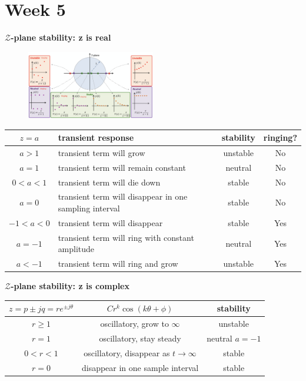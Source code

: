 \section{Week 5}
\textbf{$\mathcal{Z}$-plane stability: z is real}
\begin{figure}[H]
    \centering
    \includegraphics[width=0.5\textwidth]{images/z_plane_stability.png}
\end{figure}

\begin{table}[h]
\begin{adjustbox}{max width=\textwidth}
\begin{tabular}{|c|p{}|c|c|}
\hline
\textbf{$z=a$} & \textbf{transient response} & \textbf{stability} & \textbf{ringing?} \\\hline
$a> 1$ & transient term will grow & unstable & No \\\hline
$a = 1$ & transient term will remain constant & neutral & No \\\hline
$0<a<1$ & transient term will die down & stable & No \\\hline
$a=0$ & transient term will disappear in one sampling interval & stable & No \\\hline
$-1<a<0$ & transient term will disappear & stable & Yes \\\hline
$a = -1$ & transient term will ring with constant amplitude & neutral & Yes \\\hline
$a < -1$ & transient term will ring and grow & unstable & Yes \\\hline
\end{tabular}
\end{adjustbox}
\end{table}
\clearpage

\textbf{$\mathcal{Z}$-plane stability: z is complex}
\begin{table}[h]
\begin{adjustbox}{max width=\textwidth}
\begin{tabular}{|c|c|c|}
\hline
\textbf{$z=p\pm jq = re^{\pm j\theta}$} & \textbf{$Cr^k \cos(k\theta + \phi)$} & \textbf{stability} \\\hline
$r\ge 1$ & oscillatory, grow to $\infty$ & unstable \\\hline
$r=1$ & oscillatory, stay steady & neutral $a=-1$ \\\hline
$0<r<1$ & oscillatory, disappear as $t\to\infty$ & stable  \\\hline
$r=0$ & disappear in one sample interval & stable \\\hline
\end{tabular}
\end{adjustbox}
\end{table}

